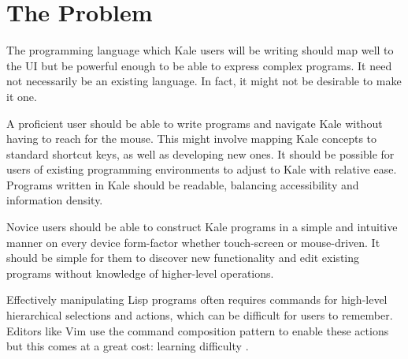 \chapter{The Problem}

The programming language which Kale users will be writing should map well to
the UI but be powerful enough to be able to express complex programs. It need
not necessarily be an existing language. In fact, it might not be desirable to
make it one.

A proficient user should be able to write programs and navigate Kale without
having to reach for the mouse. This might involve mapping Kale concepts to
standard shortcut keys, as well as developing new ones. It should be possible
for users of existing programming environments to adjust to Kale with relative
ease. Programs written in Kale should be readable, balancing accessibility and
information density.

Novice users should be able to construct Kale programs in a simple and
intuitive manner on every device form-factor whether touch-screen or
mouse-driven. It should be simple for them to discover new functionality and
edit existing programs without knowledge of higher-level operations.

Effectively manipulating Lisp programs often requires commands for high-level
hierarchical selections and actions, which can be difficult for users to
remember. Editors like Vim use the command composition
pattern to enable these actions but this comes at a great cost: learning
difficulty \citep{Chodarev2016}.

